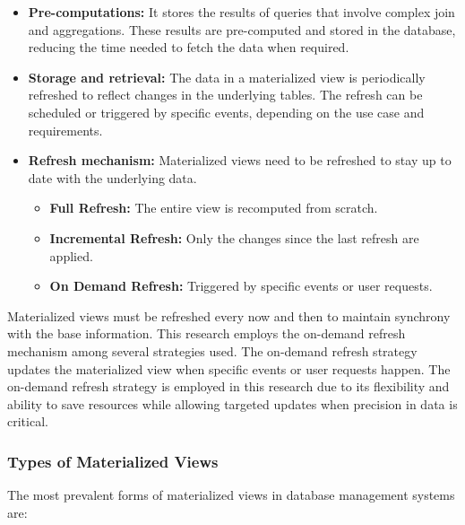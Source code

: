 \begin{itemize}
    \item\textbf{Pre-computations:} It stores the results of queries that involve complex join and aggregations. These results are pre-computed and stored in the database, reducing the time needed to fetch the data when required.
    \item\textbf{Storage and retrieval:} The data in a materialized view is periodically refreshed to reflect changes in the underlying tables. The refresh can be scheduled or triggered by specific events, depending on the use case and requirements.
    \item\textbf{Refresh mechanism:}  Materialized views need to be refreshed to stay up to date with the underlying data.\vspace{.4cm}

    \begin{itemize}
        \item\textbf{Full Refresh:} The entire view is recomputed from scratch.
        \item\textbf{Incremental Refresh:} Only the changes since the last refresh are applied.
        \item\textbf{On Demand Refresh:} Triggered by specific events or user requests.
    \end{itemize}
 
\end{itemize}\vspace{.4cm}

Materialized views must be refreshed every now and then to maintain synchrony with the base information. This research employs the on-demand refresh mechanism among several strategies used. The on-demand refresh strategy updates the materialized view when specific events or user requests happen. The on-demand refresh strategy is employed in this research due to its flexibility and ability to save resources while allowing targeted updates when precision in data is critical.

\subsubsection{Types of Materialized Views}
The most prevalent forms of materialized views in database management systems are:

\vspace{.4cm}

